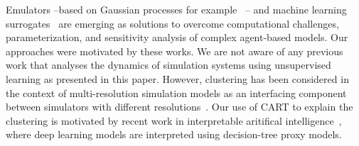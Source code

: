 \documentclass[11pt]{article}
\newcommand{\tuta}{\emph{T.~absoluta}}
\theoremstyle{definition}
\begin{document}

Emulators --based on Gaussian processes for
example~\cite{fadikar2018calibrating} -- and machine learning
surrogates~\cite{lamperti2018agent} are emerging as solutions to overcome
computational challenges, parameterization, and sensitivity analysis of
complex agent-based models. Our approaches were
motivated by these works. We are not aware of any previous
work that analyses the dynamics of simulation systems using unsupervised
learning as presented in this paper. However, clustering has been considered
in the context of multi-resolution simulation models as an interfacing
component between simulators with different
resolutions~\cite{cassandras2000clustering}. Our use of CART to explain the
clustering is motivated by recent work in interpretable aritifical
intelligence~\cite{guimapi2016modeling}, where deep learning models are
interpreted using decision-tree proxy models. 
\end{document}
